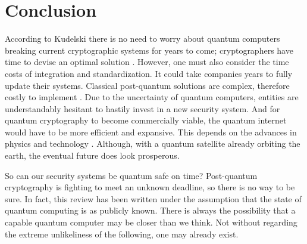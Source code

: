 \section{Conclusion}
According to Kudelski there is no need to worry about quantum computers breaking current cryptographic systems for years to come; cryptographers have time to devise an optimal solution \cite{Impact_QC_Cryptog}. However, one must also consider the time costs of integration and standardization. It could take companies years to fully update their systems. Classical post-quantum solutions are complex, therefore costly to implement \cite{Sec_Risk}. Due to the uncertainty of quantum computers, entities are understandably hesitant to hastily invest in a new security system. And for quantum cryptography to become commercially viable, the quantum internet would have to be more efficient and expansive. This depends on the advances in physics and technology \cite{Q_Cryptog}. Although, with a quantum satellite already orbiting the earth, the eventual future does look prosperous.

So can our security systems be quantum safe on time? Post-quantum cryptography is fighting to meet an unknown deadline, so there is no way to be sure. In fact, this review has been written under the assumption that the state of quantum computing is as publicly known. There is always the possibility that a capable quantum computer may be closer than we think. Not without regarding the extreme unlikeliness of the following, one may already exist. 